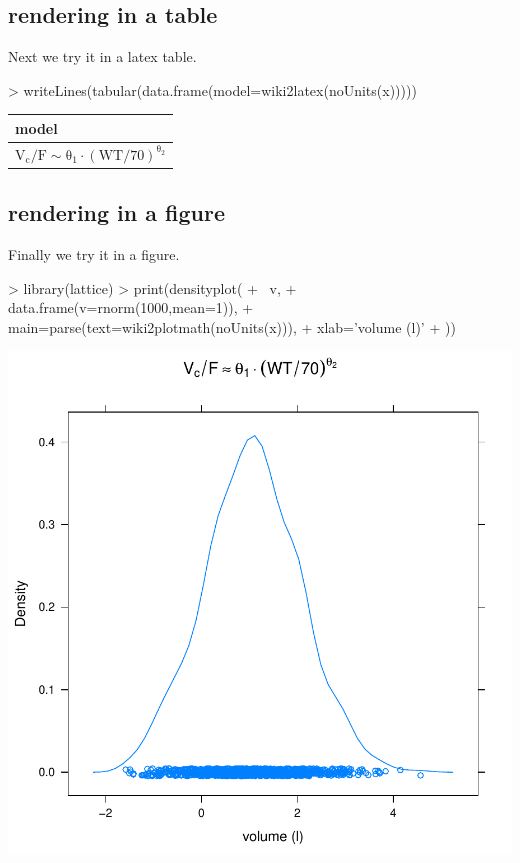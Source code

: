 \documentclass[titlepage]{article}
\begin{document}
\subsection{rendering in a table}
Next we try it in a latex table.
\begin{Schunk}
\begin{Sinput}
> writeLines(tabular(data.frame(model=wiki2latex(noUnits(x)))))
\end{Sinput}
\begin{tabular}{l}
  \hline \hline
 model \\ \hline
 $\mathrm{V_{c}/F  \sim\theta_{1}\cdot(WT/70)^{\theta_{2}}}$ \\ \hline
\end{tabular}\end{Schunk}
\subsection{rendering in a figure}
Finally we try it in a figure.
\begin{Schunk}
\begin{Sinput}
> library(lattice)
> print(densityplot(
+   ~v,
+   data.frame(v=rnorm(1000,mean=1)),
+   main=parse(text=wiki2plotmath(noUnits(x))),
+   xlab='volume (l)'
+ ))
\end{Sinput}
\end{Schunk}
\includegraphics{wikimath-figure}
\end{document}
